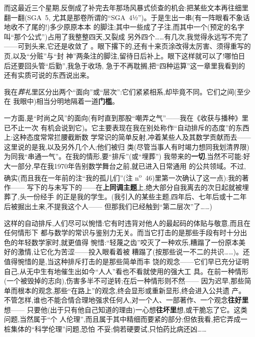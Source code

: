 而这最近三个星期,反倒成了补完去年那场风暴式侦查的机会:把某些文本再往细里翻一翻(SGA~5,
尤其是那卷所谓的“SGA~4½”)。于是生出一串(有一阵眼看不象话地收不了尾的!)多少原原本本
的脚注;其中一些成了子注,而其中一个(预定的名字叫“那个公式”)占用了我整整四天,又裂成
另外四个……有几次,我觉得永远写不完了——可到头来,它还是收敛了
。眼下撂下的,还有十来页涂改得太厉害、须得重写的页,以及“分赃”与“封
神”两条注的脚注,留待日后补上。眼下这样就可以了!哪怕日后还要回头管\dmark{}“后勤”,我急于收场,
急于不再耽搁,把“四种运算”这一章里我看到的还有实质可说的东西说出来。

我在\emph{葬礼}里区分出两个“面向”或“层次”:它们紧紧相系,却毕竟不同。它们之间(至少在
我眼中)相当分明地隔着一道\textbf{门槛}。

一方面,是“时尚之风”的面向(有时直到那股“嘲弄之气”——我在《收获与播种》里已不止一次
有机会说到它)。它主要表现在我在别处称作“自动排斥的态度”的东西上:这种态度常常拦腰截断数
学常识的简单反射,冲着某些人及其数学贡献而去——这里说的是我,以及另外几个人;他们被归
类(尽管当事人有时竭力想同我划清界限)为同我“串通一气”。在我的情形,要“排斥”(或“埋葬”)
我带来的\textbf{一切},当然不可能:好大一部分,早在我1970年告别数学舞台之前,就已进入日常通用
的公共领域。不过,
确实(而且我在一年前的注“我的孤儿们”(注 n\textsuperscript{o}~46)里第一次确认了这一点):我的著作——
写下的与未写下的——在\textbf{上同调主题}上,绝大部分自我离去的次日起就被埋葬了,头一份经手
的正是我的学生。(我引入的某些主题,四年后、七年后或十二年后被掘出土来,不提我这个人——
但那我们已经触到“第二层次”了……)

这样的自动排斥,人们尽可以惋惜:它有时违背对他人的最起码的体贴与敬意,而且在任何情形下
都与数学的常识与鉴别力无关。而当它打击的是那些手段有时十分出色的年轻数学家时,就更值得
惋惜:“轻蔑之齿”咬灭了一种欢乐,糟蹋了一份原本美好的激情,让它化为苦涩——投入眼看着被
糟蹋了(按那些说一不二的共识……)。还值得惋惜的是,\dmark{}当这种排斥打击的是那些简单而丰
饶的观念——它们早已充分证明自己,从无中生有地催生出如今“人人”看也不看就使用的强大工
具。在前一种情形(一个被毁掉的志向),伤害多半不可逆转;在后一种情形则不然——
因为迟早,那些简单而根本的观念,那些“在路上”的观念,终会显形或重新显形,终会进入公共遗
产。不管怎样,谁也不能合情合理地强求任何人,对一个人、一部著作、一个观念\textbf{往好里}想——
只要他(出于只有他自己知道的理由)一心想\textbf{往坏里}想,或干脆忘了它。这类问题,当然属于“个
人伦理”,而且属于其中精细而要紧的部分;但依我看,把它弄成一桩集体的“科学伦理”问题,恐怕
不妥;倘若硬要试,只怕药比病还凶……

